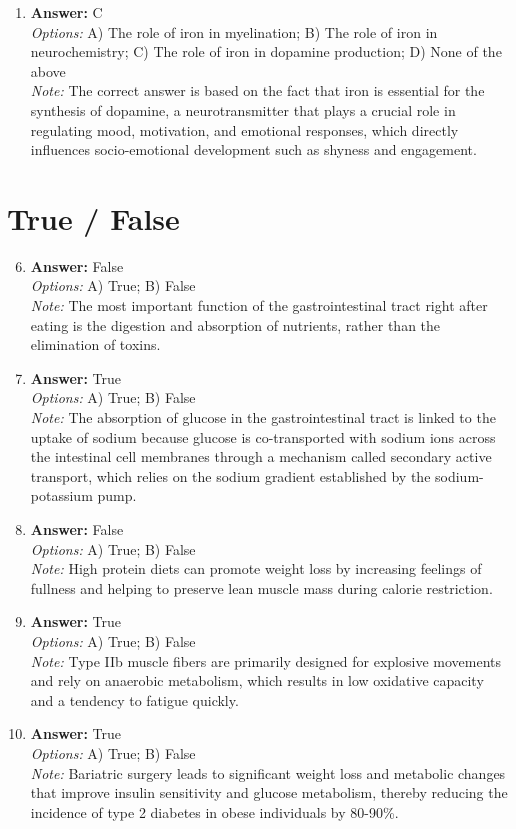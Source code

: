 \documentclass[12pt]{article}
\begin{document}
\begin{enumerate}[label=\arabic*.]
\item \textbf{Answer:} C
\\ \textit{Options:} A) The role of iron in myelination; B) The role of iron in neurochemistry; C) The role of iron in dopamine production; D) None of the above
\\ \textit{Note:} The correct answer is based on the fact that iron is essential for the synthesis of dopamine, a neurotransmitter that plays a crucial role in regulating mood, motivation, and emotional responses, which directly influences socio-emotional development such as shyness and engagement.
\end{enumerate}

\section*{True / False}
\begin{enumerate}[label=\arabic*.]
\setcounter{enumi}{5}
\item \textbf{Answer:} False
\\ \textit{Options:} A) True; B) False
\\ \textit{Note:} The most important function of the gastrointestinal tract right after eating is the digestion and absorption of nutrients, rather than the elimination of toxins.
\item \textbf{Answer:} True
\\ \textit{Options:} A) True; B) False
\\ \textit{Note:} The absorption of glucose in the gastrointestinal tract is linked to the uptake of sodium because glucose is co-transported with sodium ions across the intestinal cell membranes through a mechanism called secondary active transport, which relies on the sodium gradient established by the sodium-potassium pump.
\item \textbf{Answer:} False
\\ \textit{Options:} A) True; B) False
\\ \textit{Note:} High protein diets can promote weight loss by increasing feelings of fullness and helping to preserve lean muscle mass during calorie restriction.
\item \textbf{Answer:} True
\\ \textit{Options:} A) True; B) False
\\ \textit{Note:} Type IIb muscle fibers are primarily designed for explosive movements and rely on anaerobic metabolism, which results in low oxidative capacity and a tendency to fatigue quickly.
\item \textbf{Answer:} True
\\ \textit{Options:} A) True; B) False
\\ \textit{Note:} Bariatric surgery leads to significant weight loss and metabolic changes that improve insulin sensitivity and glucose metabolism, thereby reducing the incidence of type 2 diabetes in obese individuals by 80-90\%.
\end{enumerate}
\end{document}
